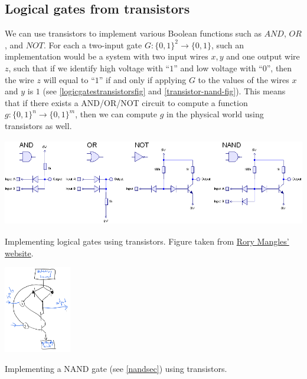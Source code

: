 \subsection{Logical gates from
transistors}\label{Logical-gates-from-transi}

We can use transistors to implement various Boolean functions such as
\(\ensuremath{\mathit{AND}}\), \(\ensuremath{\mathit{OR}}\), and
\(\ensuremath{\mathit{NOT}}\). For each a two-input gate
\(G:\{0,1\}^2 \rightarrow \{0,1\}\), such an implementation would be a
system with two input wires \(x,y\) and one output wire \(z\), such that
if we identify high voltage with ``\(1\)'' and low voltage with
``\(0\)'', then the wire \(z\) will equal to ``\(1\)'' if and only if
applying \(G\) to the values of the wires \(x\) and \(y\) is \(1\) (see
\cref{logicgatestransistorsfig} and \cref{transistor-nand-fig}). This
means that if there exists a AND/OR/NOT circuit to compute a function
\(g:\{0,1\}^n \rightarrow \{0,1\}^m\), then we can compute \(g\) in the
physical world using transistors as well.


\begin{marginfigure}
\centering
\includegraphics[width=\linewidth, height=1.5in, keepaspectratio]{../figure/DTLLogic.PNG}
\caption{Implementing logical gates using transistors. Figure taken from
\href{http://www.northdownfarm.co.uk/rory/tim/basiclogic.htm}{Rory
Mangles' website}.}
\label{logicgatestransistorsfig}
\end{marginfigure}


\begin{marginfigure}
\centering
\includegraphics[width=\linewidth, height=1.5in, keepaspectratio]{../figure/nand_transistor.png}
\caption{Implementing a NAND gate (see \cref{nandsec}) using
transistors.}
\label{transistor-nand-fig}
\end{marginfigure}

